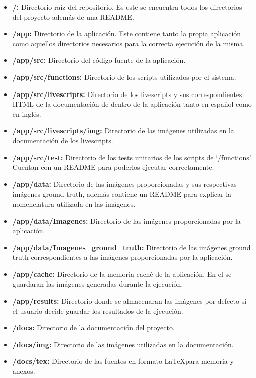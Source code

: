 \begin{itemize}
    \item \textbf{/:} Directorio raíz del repositorio. Es este se encuentra todos los directorios del proyecto además de una README.
    \item \textbf{/app:} Directorio de la aplicación. Este contiene tanto la propia aplicación como aquellos directorios necesarios para la correcta ejecución de la misma.
    \item \textbf{/app/src:} Directorio del código fuente de la aplicación.
    \item \textbf{/app/src/functions:} Directorio de los scripts utilizados por el sistema.
    \item \textbf{/app/src/livescripts:} Directorio de los livescripts y sus correspondientes HTML de la documentación de dentro de la aplicación tanto en español como en inglés.
    \item \textbf{/app/src/livescripts/img:} Directorio de las imágenes utilizadas en la documentación de los livescripts.
    \item \textbf{/app/src/test:} Directorio de los tests unitarios de los scripts de `/functions'. Cuentan con un README para poderlos ejecutar correctamente.
    \item \textbf{/app/data:} Directorio de las imágenes proporcionadas y sus respectivas imágenes ground truth, además contiene un README para explicar la nomenclatura utilizada en las imágenes.
    \item \textbf{/app/data/Imagenes:} Directorio de las imágenes proporcionadas por la aplicación.
    \item \textbf{/app/data/Imagenes\_ground\_truth:} Directorio de las imágenes ground truth correspondientes a las imágenes proporcionadas por la aplicación.
    \item \textbf{/app/cache:} Directorio de la memoria caché de la aplicación. En el se guardaran las imágenes generadas durante la ejecución.
    \item \textbf{/app/results:} Directorio donde se almacenaran las imágenes por defecto si el usuario decide guardar los resultados de la ejecución.
    \item \textbf{/docs:} Directorio de la documentación del proyecto.
    \item \textbf{/docs/img:} Directorio de las imágenes utilizadas en la documentación.
    \item \textbf{/docs/tex:} Directorio de las fuentes en formato \LaTeX para memoria y anexos.
\end{itemize}

